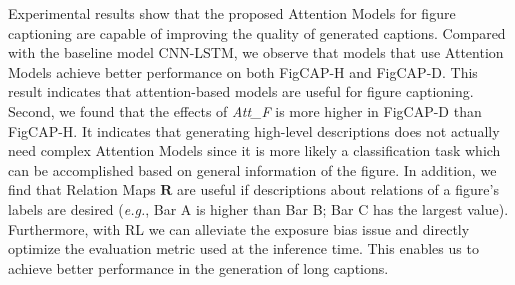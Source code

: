 \documentclass[11pt,a4paper]{article}
\begin{document}
Experimental results show that the proposed Attention Models for figure captioning are capable of improving the quality of generated captions.
Compared with the baseline model CNN-LSTM, we observe that models that use Attention Models achieve better performance on both FigCAP-H and FigCAP-D. This result indicates that attention-based models are useful for figure captioning.
Second, we found that the effects of \textit{Att\_F} is more higher in FigCAP-D than FigCAP-H. It indicates that generating high-level descriptions does not actually need complex Attention Models since it is more likely a classification task which can be accomplished based on general information of the figure.
In addition, we find that Relation Maps $\bm{R}$ are useful if descriptions about relations of a figure's labels are desired (\emph{e.g.}, Bar A is higher than Bar B; Bar C has the largest value).
Furthermore, with RL we can alleviate the exposure bias issue and directly optimize the evaluation metric used at the inference time.
This enables us to achieve better performance in the generation of long captions.



\end{document}
